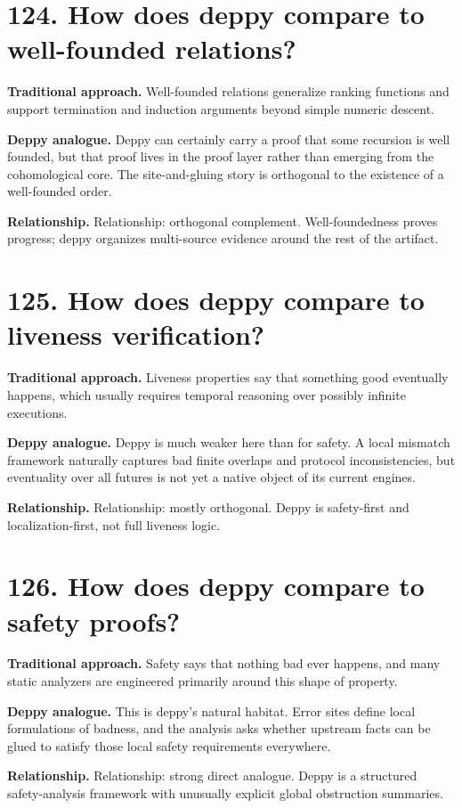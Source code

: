 \documentclass[11pt,openany]{book}
\begin{document}
\section*{124. How does deppy compare to well-founded relations?}
\textbf{Traditional approach.} Well-founded relations generalize ranking functions and support termination and induction arguments beyond simple numeric descent.

\textbf{Deppy analogue.} Deppy can certainly carry a proof that some recursion is well founded, but that proof lives in the proof layer rather than emerging from the cohomological core. The site-and-gluing story is orthogonal to the existence of a well-founded order.

\textbf{Relationship.} Relationship: orthogonal complement. Well-foundedness proves progress; deppy organizes multi-source evidence around the rest of the artifact.

\section*{125. How does deppy compare to liveness verification?}
\textbf{Traditional approach.} Liveness properties say that something good eventually happens, which usually requires temporal reasoning over possibly infinite executions.

\textbf{Deppy analogue.} Deppy is much weaker here than for safety. A local mismatch framework naturally captures bad finite overlaps and protocol inconsistencies, but eventuality over all futures is not yet a native object of its current engines.

\textbf{Relationship.} Relationship: mostly orthogonal. Deppy is safety-first and localization-first, not full liveness logic.

\section*{126. How does deppy compare to safety proofs?}
\textbf{Traditional approach.} Safety says that nothing bad ever happens, and many static analyzers are engineered primarily around this shape of property.

\textbf{Deppy analogue.} This is deppy's natural habitat. Error sites define local formulations of badness, and the analysis asks whether upstream facts can be glued to satisfy those local safety requirements everywhere.

\textbf{Relationship.} Relationship: strong direct analogue. Deppy is a structured safety-analysis framework with unusually explicit global obstruction summaries.
\end{document}
